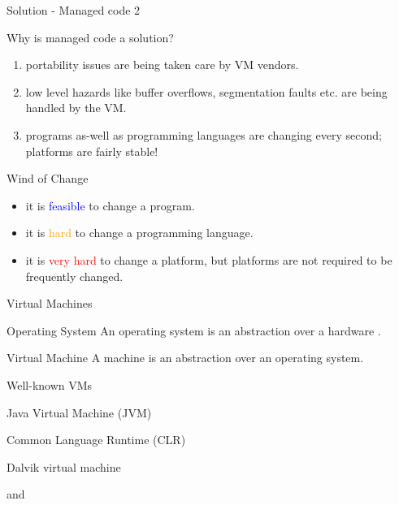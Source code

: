 
\begin{frame}{Solution - Managed code 2}
\begin{block}{Why is managed code a solution?}
\begin{enumerate}
  \pause
  \item portability issues are being taken care by VM vendors.
  \pause
  \item low level hazards like buffer overflows, segmentation faults etc. are
  being handled by the VM.
  \pause
  \item programs as-well as programming languages are changing every second;
  platforms are fairly stable!
\end{enumerate}
\end{block}
\pause
\begin{block}{Wind of Change}
\begin{itemize}
  \item it is \textcolor{blue}{feasible} to change a program.
  \item it is \textcolor{orange}{hard} to change a programming language.
  \item it is \textcolor{red}{very hard} to change a platform, but platforms are
  not required to be frequently changed.
\end{itemize}
\end{block}
\end{frame}

\begin{frame}{Virtual Machines}
\begin{block}{Operating System}
An operating system is an abstraction over a hardware .
\end{block}
\pause
\begin{block}{Virtual Machine}
A  machine is an abstraction over an operating system.
\end{block}
\pause
\begin{exampleblock}{Well-known VMs}
\begin{description}
  \item[Java] Java Virtual Machine (JVM)
  \item[.Net] Common Language Runtime (CLR)
  \item[Android] Dalvik virtual machine
  \item
  and
\end{description}
\end{exampleblock}
\end{frame}

